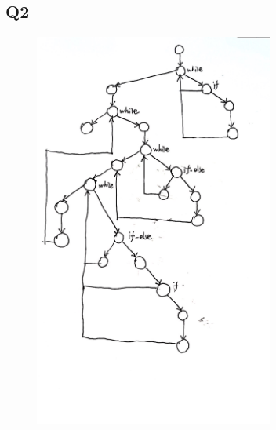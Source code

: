 \documentclass[12pt]{article}
\begin{document}
\subsection*{Q2}
\begin{figure}[hbt!]
  \centering
  \includegraphics[width=0.7\textwidth]{control_flow.jpg}
\end{figure}
\end{document}
